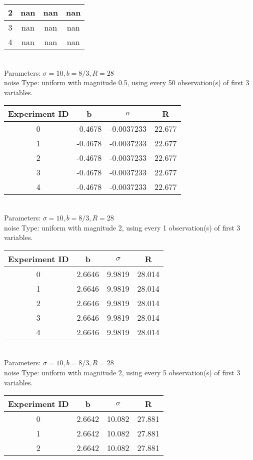 \begin{multicols}{3}
\begin{tabular}{cccc}
 2 & nan & nan & nan\\ \hline 
 3 & nan & nan & nan\\ \hline 
 4 & nan & nan & nan\\ \hline 
 \end{tabular}\\
Parameters: $\sigma=10, b=8/3, R=28$\\
noise Type: uniform with magnitude 0.5, using every 50 observation(s) of first 3 variables.\\
\begin{tabular}{cccc}
\hline Experiment ID & b & $\sigma$ & R \\ \hline 
0 & -0.4678 & -0.0037233 & 22.677\\ \hline 
 1 & -0.4678 & -0.0037233 & 22.677\\ \hline 
 2 & -0.4678 & -0.0037233 & 22.677\\ \hline 
 3 & -0.4678 & -0.0037233 & 22.677\\ \hline 
 4 & -0.4678 & -0.0037233 & 22.677\\ \hline 
 \end{tabular}\\
Parameters: $\sigma=10, b=8/3, R=28$\\
noise Type: uniform with magnitude 2, using every 1 observation(s) of first 3 variables.\\
\begin{tabular}{cccc}
\hline Experiment ID & b & $\sigma$ & R \\ \hline 
0 & 2.6646 & 9.9819 & 28.014\\ \hline 
 1 & 2.6646 & 9.9819 & 28.014\\ \hline 
 2 & 2.6646 & 9.9819 & 28.014\\ \hline 
 3 & 2.6646 & 9.9819 & 28.014\\ \hline 
 4 & 2.6646 & 9.9819 & 28.014\\ \hline 
 \end{tabular}\\
Parameters: $\sigma=10, b=8/3, R=28$\\
noise Type: uniform with magnitude 2, using every 5 observation(s) of first 3 variables.\\
\begin{tabular}{cccc}
\hline Experiment ID & b & $\sigma$ & R \\ \hline 
0 & 2.6642 & 10.082 & 27.881\\ \hline 
 1 & 2.6642 & 10.082 & 27.881\\ \hline 
 2 & 2.6642 & 10.082 & 27.881\\ \hline 

\end{tabular}
\end{multicols}
